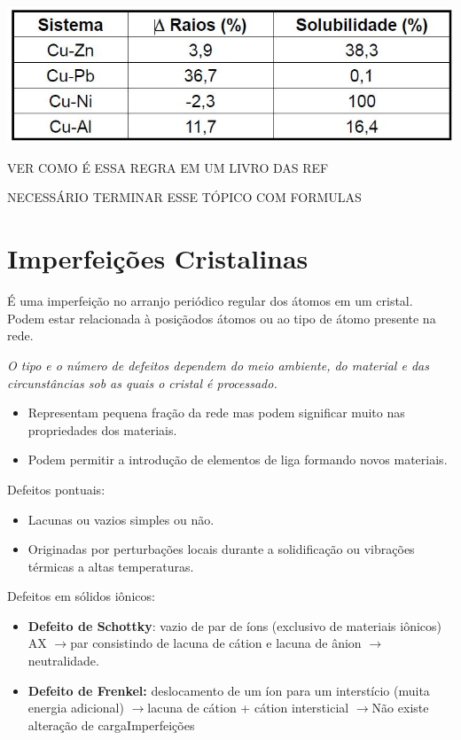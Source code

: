 \includegraphics[scale=0.4,trim={0 0 0 0}]{figures/hume}


{\LARGE VER COMO É ESSA REGRA EM UM LIVRO DAS REF}

{\LARGE NECESSÁRIO TERMINAR ESSE TÓPICO COM FORMULAS}


\section{Imperfeições Cristalinas}

É uma imperfeição no arranjo periódico regular dos átomos em um cristal. Podem estar relacionada à posiçãodos átomos ou ao tipo de átomo presente na rede.

\textit{O tipo e o número de defeitos dependem do meio ambiente, do material e das circunstâncias sob as quais o cristal é processado.}

\begin{itemize}
	\item Representam pequena fração da rede mas podem significar muito nas propriedades dos materiais.
	\item Podem permitir a introdução de elementos de liga formando novos materiais.
\end{itemize}

Defeitos pontuais:

\begin{itemize}
	\item Lacunas ou vazios simples ou não.
	\item Originadas por perturbações locais durante a solidificação ou vibrações térmicas a altas temperaturas.
\end{itemize}

Defeitos em sólidos iônicos:

\begin{itemize}
	\item \textbf{Defeito de Schottky}: vazio de par de íons (exclusivo de materiais iônicos) AX $\rightarrow$par consistindo de lacuna de cátion e lacuna de ânion $\rightarrow$ neutralidade.
	\item \textbf{Defeito de Frenkel:} deslocamento de um íon para um interstício (muita energia adicional) $\rightarrow$lacuna de cátion + cátion intersticial $\rightarrow$Não existe alteração de cargaImperfeições
\end{itemize}


